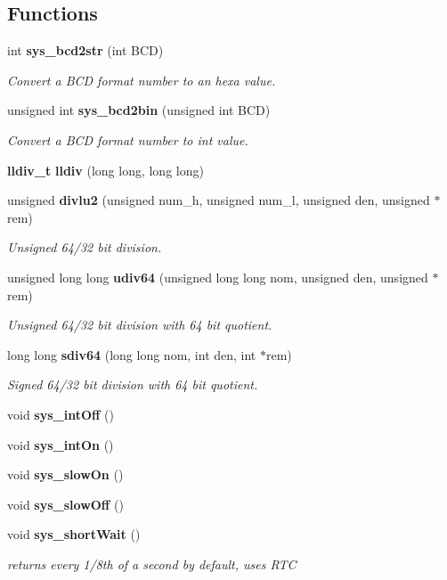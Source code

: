 \subsection*{Functions}
\begin{CompactItemize}
\item 
int {\bf sys\_\-bcd2str} (int BCD)
\begin{CompactList}\small\item\em Convert a BCD format number to an hexa value.\item\end{CompactList}\item 
unsigned int {\bf sys\_\-bcd2bin} (unsigned int BCD)
\begin{CompactList}\small\item\em Convert a BCD format number to int value.\item\end{CompactList}\item 
{\bf lldiv\_\-t} {\bf lldiv} (long long, long long)
\item 
unsigned {\bf divlu2} (unsigned num\_\-h, unsigned num\_\-l, unsigned den, unsigned $\ast$rem)
\begin{CompactList}\small\item\em Unsigned 64/32 bit division.\item\end{CompactList}\item 
unsigned long long {\bf udiv64} (unsigned long long nom, unsigned den, unsigned $\ast$rem)
\begin{CompactList}\small\item\em Unsigned 64/32 bit division with 64 bit quotient.\item\end{CompactList}\item 
long long {\bf sdiv64} (long long nom, int den, int $\ast$rem)
\begin{CompactList}\small\item\em Signed 64/32 bit division with 64 bit quotient.\item\end{CompactList}\item 
void {\bf sys\_\-int\-Off} ()
\item 
void {\bf sys\_\-int\-On} ()
\item 
void {\bf sys\_\-slow\-On} ()
\item 
void {\bf sys\_\-slow\-Off} ()
\item 
void {\bf sys\_\-short\-Wait} ()
\begin{CompactList}\small\item\em returns every 1/8th of a second by default, uses RTC\item\end{CompactList}\item 

\end{CompactItemize}
